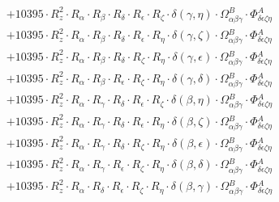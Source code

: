 \documentclass{article}
\begin{document}
\begin{equation}
\begin{array}{c}
 \\[0.2em] 		 + 10395 \cdot R_{z}^{2} \cdot R_{\alpha{}} \cdot R_{\beta{}} \cdot R_{\delta{}} \cdot R_{\epsilon{}} \cdot R_{\zeta{}} \cdot \delta{}\left(\gamma{}, \eta{}\right) \cdot \Omega{}^{B}_{\alpha{}\beta{}\gamma{}} \cdot \Phi{}^{A}_{\delta{}\epsilon{}\zeta{}\eta{}} 
 \\[0.2em] 		 + 10395 \cdot R_{z}^{2} \cdot R_{\alpha{}} \cdot R_{\beta{}} \cdot R_{\delta{}} \cdot R_{\epsilon{}} \cdot R_{\eta{}} \cdot \delta{}\left(\gamma{}, \zeta{}\right) \cdot \Omega{}^{B}_{\alpha{}\beta{}\gamma{}} \cdot \Phi{}^{A}_{\delta{}\epsilon{}\zeta{}\eta{}} 
 \\[0.2em] 		 + 10395 \cdot R_{z}^{2} \cdot R_{\alpha{}} \cdot R_{\beta{}} \cdot R_{\delta{}} \cdot R_{\zeta{}} \cdot R_{\eta{}} \cdot \delta{}\left(\gamma{}, \epsilon{}\right) \cdot \Omega{}^{B}_{\alpha{}\beta{}\gamma{}} \cdot \Phi{}^{A}_{\delta{}\epsilon{}\zeta{}\eta{}} 
 \\[0.2em] 		 + 10395 \cdot R_{z}^{2} \cdot R_{\alpha{}} \cdot R_{\beta{}} \cdot R_{\epsilon{}} \cdot R_{\zeta{}} \cdot R_{\eta{}} \cdot \delta{}\left(\gamma{}, \delta{}\right) \cdot \Omega{}^{B}_{\alpha{}\beta{}\gamma{}} \cdot \Phi{}^{A}_{\delta{}\epsilon{}\zeta{}\eta{}} 
 \\[0.2em] 		 + 10395 \cdot R_{z}^{2} \cdot R_{\alpha{}} \cdot R_{\gamma{}} \cdot R_{\delta{}} \cdot R_{\epsilon{}} \cdot R_{\zeta{}} \cdot \delta{}\left(\beta{}, \eta{}\right) \cdot \Omega{}^{B}_{\alpha{}\beta{}\gamma{}} \cdot \Phi{}^{A}_{\delta{}\epsilon{}\zeta{}\eta{}} 
 \\[0.2em] 		 + 10395 \cdot R_{z}^{2} \cdot R_{\alpha{}} \cdot R_{\gamma{}} \cdot R_{\delta{}} \cdot R_{\epsilon{}} \cdot R_{\eta{}} \cdot \delta{}\left(\beta{}, \zeta{}\right) \cdot \Omega{}^{B}_{\alpha{}\beta{}\gamma{}} \cdot \Phi{}^{A}_{\delta{}\epsilon{}\zeta{}\eta{}} 
 \\[0.2em] 		 + 10395 \cdot R_{z}^{2} \cdot R_{\alpha{}} \cdot R_{\gamma{}} \cdot R_{\delta{}} \cdot R_{\zeta{}} \cdot R_{\eta{}} \cdot \delta{}\left(\beta{}, \epsilon{}\right) \cdot \Omega{}^{B}_{\alpha{}\beta{}\gamma{}} \cdot \Phi{}^{A}_{\delta{}\epsilon{}\zeta{}\eta{}} 
 \\[0.2em] 		 + 10395 \cdot R_{z}^{2} \cdot R_{\alpha{}} \cdot R_{\gamma{}} \cdot R_{\epsilon{}} \cdot R_{\zeta{}} \cdot R_{\eta{}} \cdot \delta{}\left(\beta{}, \delta{}\right) \cdot \Omega{}^{B}_{\alpha{}\beta{}\gamma{}} \cdot \Phi{}^{A}_{\delta{}\epsilon{}\zeta{}\eta{}} 
 \\[0.2em] 		 + 10395 \cdot R_{z}^{2} \cdot R_{\alpha{}} \cdot R_{\delta{}} \cdot R_{\epsilon{}} \cdot R_{\zeta{}} \cdot R_{\eta{}} \cdot \delta{}\left(\beta{}, \gamma{}\right) \cdot \Omega{}^{B}_{\alpha{}\beta{}\gamma{}} \cdot \Phi{}^{A}_{\delta{}\epsilon{}\zeta{}\eta{}} 

\end{array}
\end{equation}
\end{document}
